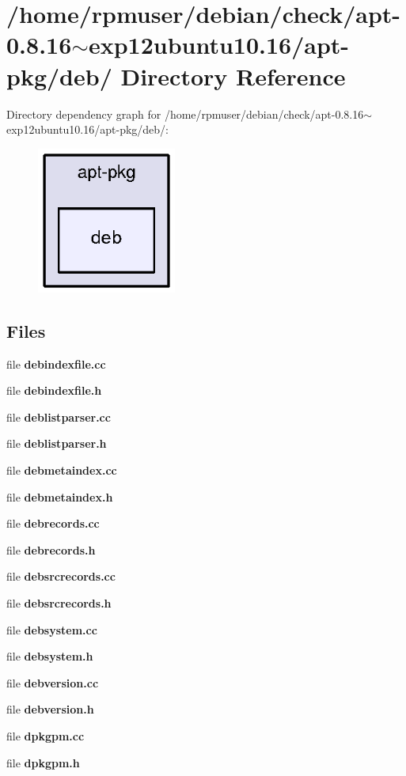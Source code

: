 \section{/home/rpmuser/debian/check/apt-\/0.8.16$\sim$exp12ubuntu10.16/apt-\/pkg/deb/ \-Directory \-Reference}
\label{dir_517cd22fefd845d315da9c857199d49f}
\-Directory dependency graph for /home/rpmuser/debian/check/apt-\/0.8.16$\sim$exp12ubuntu10.16/apt-\/pkg/deb/\-:
\nopagebreak
\begin{figure}[H]
\begin{center}
\leavevmode
\includegraphics[width=130pt]{dir_517cd22fefd845d315da9c857199d49f_dep}
\end{center}
\end{figure}
\subsection*{\-Files}
\begin{DoxyCompactItemize}
\item 
file {\bfseries debindexfile.\-cc}
\item 
file {\bfseries debindexfile.\-h}
\item 
file {\bfseries deblistparser.\-cc}
\item 
file {\bfseries deblistparser.\-h}
\item 
file {\bfseries debmetaindex.\-cc}
\item 
file {\bfseries debmetaindex.\-h}
\item 
file {\bfseries debrecords.\-cc}
\item 
file {\bfseries debrecords.\-h}
\item 
file {\bfseries debsrcrecords.\-cc}
\item 
file {\bfseries debsrcrecords.\-h}
\item 
file {\bfseries debsystem.\-cc}
\item 
file {\bfseries debsystem.\-h}
\item 
file {\bfseries debversion.\-cc}
\item 
file {\bfseries debversion.\-h}
\item 
file {\bfseries dpkgpm.\-cc}
\item 
file {\bfseries dpkgpm.\-h}
\end{DoxyCompactItemize}
